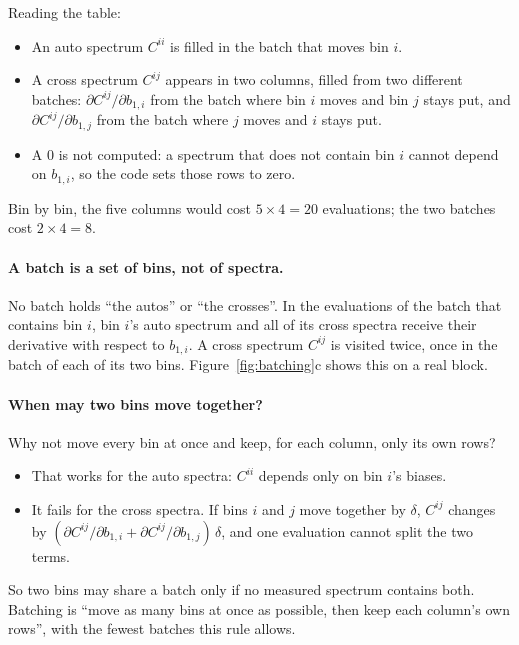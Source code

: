 \documentclass[11pt]{article}
\begin{document}
Reading the table:
\begin{itemize}
  \item An auto spectrum $C^{ii}$ is filled in the batch that moves
    bin $i$.
  \item A cross spectrum $C^{ij}$ appears in two columns, filled from
    two different batches: $\partial C^{ij}/\partial b_{1,i}$ from the
    batch where bin $i$ moves and bin $j$ stays put, and
    $\partial C^{ij}/\partial b_{1,j}$ from the batch where $j$ moves and
    $i$ stays put.
  \item A $0$ is not computed: a spectrum that does not contain bin $i$
    cannot depend on $b_{1,i}$, so the code sets those rows to zero.
\end{itemize}
Bin by bin, the five columns would cost $5 \times 4 = 20$ evaluations;
the two batches cost $2 \times 4 = 8$.

\paragraph{A batch is a set of bins, not of spectra.}
No batch holds ``the autos'' or ``the crosses''.  In the evaluations of
the batch that contains bin $i$, bin $i$'s auto spectrum and all of its
cross spectra receive their derivative with respect to $b_{1,i}$.  A
cross spectrum $C^{ij}$ is visited twice, once in the batch of each of
its two bins.  Figure~\ref{fig:batching}c shows this on a real block.

\paragraph{When may two bins move together?}
Why not move every bin at once and keep, for each column, only its own
rows?
\begin{itemize}
  \item That works for the auto spectra: $C^{ii}$ depends only on bin
    $i$'s biases.
  \item It fails for the cross spectra.  If bins $i$ and $j$ move
    together by $\delta$, $C^{ij}$ changes by
    $(\partial C^{ij}/\partial b_{1,i}
    + \partial C^{ij}/\partial b_{1,j})\,\delta$, and one evaluation
    cannot split the two terms.
\end{itemize}
So two bins may share a batch only if no measured spectrum contains
both.  Batching is ``move as many bins at once as possible, then keep
each column's own rows'', with the fewest batches this rule allows.
\end{document}

